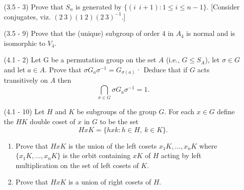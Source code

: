 \documentclass[12pt]{article}
\begin{document}
\begin{enumerate}
\begin{mybox}
    \vspace*{10mm}
\end{mybox}


\item[(3.5 - 3)] Prove that $S_n$ is generated by
    $\{(i\ \ i+1): 1\leq i\leq n-1\}$. [Consider conjugates,
    viz. $(2\ 3)(1\ 2)(2\ 3)^{-1}$.]

\begin{mybox}
    
    \vspace*{10mm}
\end{mybox}

    
\item[(3.5 - 9)] Prove that the (unique) subgroup of
    order 4 in $A_4$ is normal and is isomorphic to
    $V_4$.
  
\begin{mybox}

    \vspace*{10mm}
\end{mybox}


\item[(4.1 - 2)] Let G be a permutation group on the
    set $A$ (i.e., $G\leq S_A$), let $\sigma\in G$ and
    let $a\in A$. Prove that $\sigma G_a \sigma^{-1}
    = G_{\sigma(a)}$·
    Deduce that if $G$ acts transitively on $A$ then
    $$\bigcap_{\sigma\in G}{\sigma G_a \sigma^{-1}}=1.$$
\begin{mybox}
     
    \vspace*{10mm}
\end{mybox}
  

\item[(4.1 - 10)] Let $H$ and $K$ be subgroups of the
    group $G$. For each $x\in G$ define the $HK$ double
    coset of $x$ in $G$ to be the set
    $$HxK=\{hxk:h\in H,\ k\in K\}.$$
\begin{enumerate}
    
\item Prove that $HxK$ is the union of the left
    cosets $x_1K,\ldots,x_nK$ where $\{x_1K,\ldots,x_nK\}$
    is the orbit containing $xK$ of $H$ acting by left
    multiplication on the set of left cosets of $K$.
\begin{mybox}
    
    \vspace*{10mm}
\end{mybox}

\item Prove that $HxK$ is a union of right cosets of $H$.
\begin{mybox}
    

\end{mybox}
\end{enumerate}
\end{enumerate}
\end{document}
